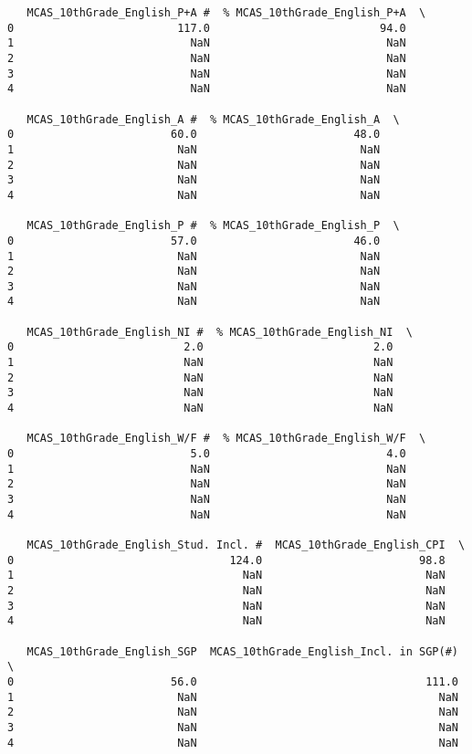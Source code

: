 \documentclass[11pt]{article}
\begin{document}
\begin{verbatim}
   MCAS_10thGrade_English_P+A #  % MCAS_10thGrade_English_P+A  \
0                         117.0                          94.0   
1                           NaN                           NaN   
2                           NaN                           NaN   
3                           NaN                           NaN   
4                           NaN                           NaN   

   MCAS_10thGrade_English_A #  % MCAS_10thGrade_English_A  \
0                        60.0                        48.0   
1                         NaN                         NaN   
2                         NaN                         NaN   
3                         NaN                         NaN   
4                         NaN                         NaN   

   MCAS_10thGrade_English_P #  % MCAS_10thGrade_English_P  \
0                        57.0                        46.0   
1                         NaN                         NaN   
2                         NaN                         NaN   
3                         NaN                         NaN   
4                         NaN                         NaN   

   MCAS_10thGrade_English_NI #  % MCAS_10thGrade_English_NI  \
0                          2.0                          2.0   
1                          NaN                          NaN   
2                          NaN                          NaN   
3                          NaN                          NaN   
4                          NaN                          NaN   

   MCAS_10thGrade_English_W/F #  % MCAS_10thGrade_English_W/F  \
0                           5.0                           4.0   
1                           NaN                           NaN   
2                           NaN                           NaN   
3                           NaN                           NaN   
4                           NaN                           NaN   

   MCAS_10thGrade_English_Stud. Incl. #  MCAS_10thGrade_English_CPI  \
0                                 124.0                        98.8   
1                                   NaN                         NaN   
2                                   NaN                         NaN   
3                                   NaN                         NaN   
4                                   NaN                         NaN   

   MCAS_10thGrade_English_SGP  MCAS_10thGrade_English_Incl. in SGP(#)  \
0                        56.0                                   111.0   
1                         NaN                                     NaN   
2                         NaN                                     NaN   
3                         NaN                                     NaN   
4                         NaN                                     NaN   


\end{verbatim}
\end{document}
